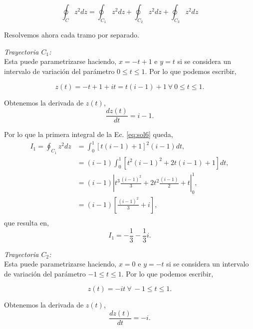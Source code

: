 \documentclass[10pt,a4paper]{article}
\begin{document}
\begin{enumerate}
\begin{profesor}
	\begin{equation}
	\oint_{C}z^2dz=\oint_{C_1}z^2dz+\oint_{C_2}z^2dz+\oint_{C_3}z^2dz
	\label{eq:sol6}
 	\end{equation}

	Resolvemos ahora cada tramo por separado.
	
	\textit{Trayectoria $C_1$:}\\
	Esta puede parametrizarse haciendo, $x=-t+1$ e $y=t$ si se considera un 
	intervalo de variaci\'on del par\'ametro $0\leq t \leq 1$. Por lo que 
	podemos escribir,

	\begin{equation}
	z(t)=-t+1+it=t(i-1)+1~ \forall ~ 0 \leq t \leq 1.
	\end{equation}
	
	Obtenemos la derivada de $z(t)$,
	\begin{equation}
	\dfrac{dz(t)}{dt} = i-1.
	\end{equation}
	
	Por lo que la primera integral de la Ec. \ref{eq:sol6} queda,
	\begin{equation}
	\begin{split}
	I_1=\oint_{C_1}z^2dz & = \int_{0}^{1} [t(i-1)+1]^2 (i-1)dt,\\
	& = (i-1) \int_{0}^{1} [t^2(i-1)^2+2t(i-1)+1] dt,\\
	& = (i-1) \left| t^3 \frac{(i-1)^2}{3}+2t^2\frac{(i-1)}{2}+t \right|_0^1,\\
	& = (i-1) \left[\frac{(i-1)^2}{3}+i\right],\\
	\end{split}
	\end{equation}	
	que resulta en,
	\begin{equation}
	I_1=-\frac{1}{3}	-\frac{1}{3}i.
	\label{eq:sol61}
	\end{equation}

	\textit{Trayectoria $C_2$:}\\
	Esta puede parametrizarse haciendo, $x=0$ e $y=-t$ si se considera un 
	intervalo de variaci\'on del par\'ametro $-1\leq t \leq 1$. Por lo que 
	podemos escribir,

	\begin{equation}
	z(t)=-it~ \forall ~ -1 \leq t \leq 1.
	\end{equation}
	
	Obtenemos la derivada de $z(t)$,
	\begin{equation}
	\dfrac{dz(t)}{dt} = -i.
	\end{equation}
	

\end{profesor}
\end{enumerate}
\end{document}
